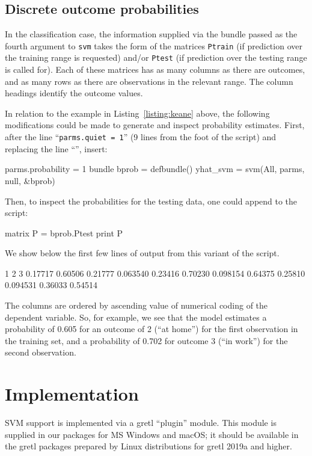 \documentclass{article}
\begin{document}
\subsection{Discrete outcome probabilities}
\label{sec:SVC-probs}

In the classification case, the information supplied via the bundle
passed as the fourth argument to \texttt{svm} takes the form of the
matrices \texttt{Ptrain} (if prediction over the training range is
requested) and/or \texttt{Ptest} (if prediction over the testing range
is called for). Each of these matrices has as many columns as there
are outcomes, and as many rows as there are observations in the
relevant range. The column headings identify the outcome values.

In relation to the example in Listing~\ref{listing:keane} above, the
following modifications could be made to generate and inspect
probability estimates. First, after the line ``\texttt{parms.quiet =
  1}'' (9 lines from the foot of the script) and replacing the line
``'', insert:
%
\begin{code}
parms.probability = 1
bundle bprob = defbundle()
yhat_svm = svm(All, parms, null, &bprob)
\end{code}
Then, to inspect the probabilities for the testing data, one could
append to the script:
%
\begin{code}
matrix P = bprob.Ptest
print P
\end{code}
%
We show below the first few lines of output from this variant of
the script.
%
\begin{code}
           1            2            3
     0.17717      0.60506      0.21777
    0.063540      0.23416      0.70230
    0.098154      0.64375      0.25810
    0.094531      0.36033      0.54514
\end{code}
%
The columns are ordered by ascending value of numerical coding of the
dependent variable. So, for example, we see that the model estimates a
probability of 0.605 for an outcome of 2 (``at home'') for the first
observation in the training set, and a probability of 0.702 for
outcome 3 (``in work'') for the second observation.

\section{Implementation}
\label{sec:implement}

SVM support is implemented via a gretl ``plugin'' module. This module
is supplied in our packages for MS Windows and macOS; it should be
available in the gretl packages prepared by Linux distributions for
gretl 2019a and higher.
\end{document}
